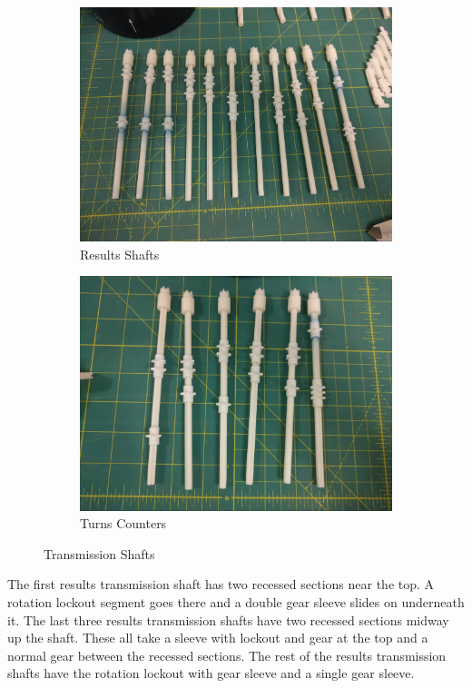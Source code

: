 \documentclass[openany]{book}
\begin{document}
\begin{figure}[!ht]
	\centering
	\begin{subfigure}{.4\textwidth}
		\centering
		\includegraphics[width=.95\textwidth]{images/image21.jpg}
		\caption{Results Shafts}
		\label{fig:image21}	
	\end{subfigure}
	\begin{subfigure}{.4\textwidth}
		\centering
		\includegraphics[width=.95\textwidth]{images/image40.jpg}
		\caption{Turns Counters}
		\label{fig:image40}	
	\end{subfigure}
	\caption{Transmission Shafts}
	\label{fig:transmission}
\end{figure}


The first results transmission shaft has two recessed sections near the top. A rotation lockout segment goes there and a double gear sleeve slides on underneath it. The last three results transmission shafts have two recessed sections midway up the shaft. These all take a sleeve with lockout and gear at the top and a normal gear between the recessed sections. The rest of the results transmission shafts have the rotation lockout with gear sleeve and a single gear sleeve.
\end{document}
